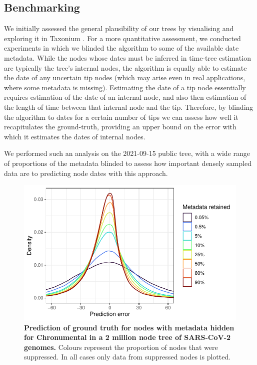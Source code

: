 \subsection*{Benchmarking}

We initially assessed the general plausibility of our trees by visualising and exploring it in Taxonium \citep{taxonium}. For a more quantitative assessment, we conducted experiments in which we blinded the algorithm to some of the available date metadata. While the nodes whose dates must be inferred in time-tree estimation are typically the tree's internal nodes, the algorithm is equally able to estimate the date of any uncertain tip nodes (which may arise even in real applications, where some metadata is missing). Estimating the date of a tip node essentially requires estimation of the date of an internal node, and also then estimation of the length of time between that internal node and the tip. Therefore, by blinding the algorithm to dates for a certain number of tips we can assess how well it recapitulates the ground-truth, providing an upper bound on the error with which it estimates the dates of internal nodes.

We performed such an analysis on the 2021-09-15 public tree, with a wide range of proportions of the metadata blinded to assess how important densely sampled data are to predicting node dates with this approach.

\begin{figure}[t!]
\centering
\includegraphics[width=0.7\linewidth]{manuscript/Figures/blinding.pdf}

\caption{\textbf{Prediction of ground truth for nodes with metadata hidden for Chronumental in a 2 million node tree of SARS-CoV-2 genomes.}
 Colours represent the proportion of nodes that were suppressed. In all cases only data from suppressed nodes is plotted.\label{agreement}}

\end{figure}


